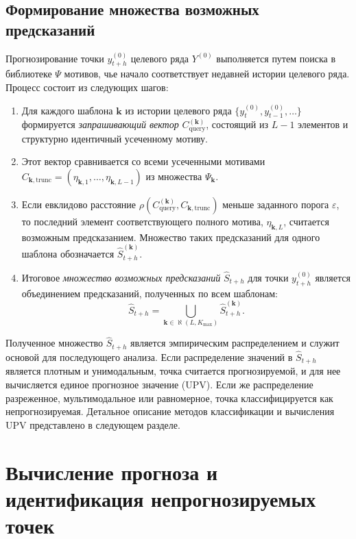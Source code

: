 \documentclass[a4paper,12pt]{extarticle}
\begin{document}
\subsection{Формирование множества возможных предсказаний}

Прогнозирование точки $y_{t+h}^{(0)}$ целевого ряда $Y^{(0)}$
 выполняется путем поиска в библиотеке $\Psi$ мотивов, чье начало
  соответствует недавней истории целевого ряда. Процесс состоит из следующих шагов:
\begin{enumerate}
    \item Для каждого шаблона $\boldsymbol{k}$ из истории целевого
     ряда $\{y_{t}^{(0)}, y_{t-1}^{(0)}, \dots\}$ формируется \textit{запрашивающий вектор}
      $C_{\text{query}}^{(\boldsymbol{k})}$, состоящий из $L-1$ элементов
       и структурно идентичный усеченному мотиву.

    \item Этот вектор сравнивается со всеми усеченными мотивами $C_{\boldsymbol{k},
     \text{trunc}} = (\eta_{\boldsymbol{k},1}, \dots, \eta_{\boldsymbol{k}, L-1})$
     из множества $\Psi_{\boldsymbol{k}}$.

    \item Если евклидово расстояние $\rho(C_{\text{query}}^{(\boldsymbol{k})},
     C_{\boldsymbol{k}, \text{trunc}})$ меньше заданного порога $\varepsilon$,
      то последний элемент соответствующего полного мотива, $\eta_{\boldsymbol{k},L}$,
       считается возможным предсказанием. Множество таких предсказаний для одного шаблона
       обозначается $\hat{S}_{t+h}^{(\boldsymbol{k})}$.

    \item Итоговое \textit{множество возможных предсказаний} $\hat{S}_{t+h}$ для
     точки $y_{t+h}^{(0)}$ является объединением предсказаний, полученных по всем шаблонам:
    \[
    \hat{S}_{t+h} = \bigcup_{\boldsymbol{k} \in \aleph(L, K_{\max})} \hat{S}_{t+h}^{(\boldsymbol{k})}.
    \]
\end{enumerate}

Полученное множество $\hat{S}_{t+h}$ является эмпирическим распределением и служит
 основой для последующего анализа. Если распределение значений в $\hat{S}_{t+h}$
  является плотным и унимодальным, точка считается прогнозируемой, и для нее
  вычисляется единое прогнозное значение (UPV). Если же распределение разреженное,
   мультимодальное или равномерное, точка классифицируется как непрогнозируемая.
    Детальное описание методов классификации и вычисления UPV представлено в следующем разделе.
\section{Вычисление прогноза и идентификация непрогнозируемых точек}
\end{document}

